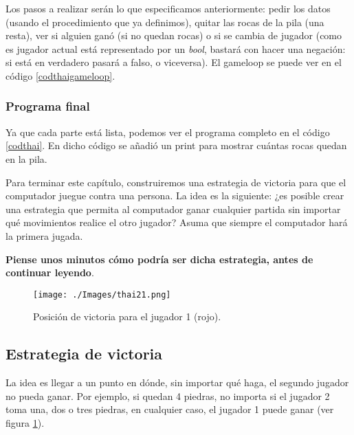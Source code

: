 Los pasos a realizar serán lo que especificamos anteriormente: pedir los datos (usando el procedimiento que ya definimos), quitar las rocas de la pila (una resta), ver si alguien ganó (si no quedan rocas) o si se cambia de jugador (como es jugador actual está representado por un \emph{bool}, bastará con hacer una negación: si está en verdadero pasará a falso, o viceversa). El gameloop se puede ver en el código \ref{codthaigameloop}. \\



\subsubsection{Programa final}

Ya que cada parte está lista, podemos ver el programa completo en el código \ref{codthai}. En dicho código se añadió un print para mostrar cuántas rocas quedan en la pila. \\



\newpage

Para terminar este capítulo, construiremos una estrategia de victoria para que el computador juegue contra una persona. La idea es la siguiente: ¿es posible crear una estrategia que permita al computador ganar cualquier partida sin importar qué movimientos realice el otro jugador? Asuma que siempre el computador hará la primera jugada. 

\textbf{Piense unos minutos cómo podría ser dicha estrategia, antes de continuar leyendo}.

\newpage

\begin{figure}[h!]
	\centering
	\texttt{[image: ./Images/thai21.png]}
	\caption{Posición de victoria para el jugador 1 (rojo).}
	\label{figthaiA}
\end{figure}

\subsection{Estrategia de victoria}
La idea es llegar a un punto en dónde, sin importar qué haga, el segundo jugador no pueda ganar. Por ejemplo, si quedan 4 piedras, no importa si el jugador 2 toma una, dos o tres piedras, en cualquier caso, el jugador 1 puede ganar (ver figura \ref{figthaiA}).

